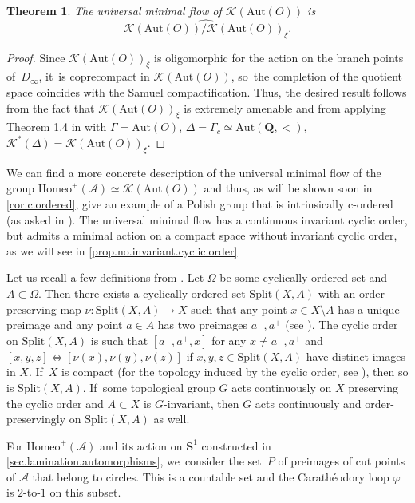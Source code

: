 \documentclass[JEP,XML,SOM,Unicode,NoFloatCountersInSection,published]{cedram}
\theoremstyle{plain}
\newtheorem{theorem}{Theorem}[section]
\theoremstyle{definition}
\theoremstyle{remark}
\newcommand{\Aut}{\mathrm{Aut}}
\newcommand{\Homeo}{\mathrm{Homeo}}
\newcommand{\Split}{\mathrm{Split}}
\newcommand{\A}{\mathcal{A}}
\newcommand{\K}{\mathcal{K}}
\begin{document}
\begin{theorem}
\label{thm.universal.minimal.flow.airplane.completion}
The universal minimal flow of $\K(\Aut(O))$ is
\[
\widehat{\K(\Aut(O))/\K(\Aut(O) )_\xi}.
\]
\end{theorem}

\begin{proof}
Since $\K(\Aut(O) )_\xi$ is oligomorphic for the action on the branch points of~$D_\infty$, it~is coprecompact in $\K(\Aut(O))$, so~the completion of the quotient space coincides with the Samuel compactification.
Thus, the desired result follows from the fact that $\K(\Aut(O) )_\xi$ is extremely amenable and from applying Theorem 1.4 in \cite{Kaleidoscopic2} with $\Gamma=\Aut(O)$, $\Delta=\Gamma_c\simeq \Aut(\mathbf{Q},<)$, $\K^*(\Delta)=\K(\Aut(O) )_\xi$.
\end{proof}

We can find a more concrete description of the universal minimal flow of the group $\Homeo^+(\A)\simeq\K(\Aut(O))$ and thus, as will be shown soon in \cref{cor.c.ordered}, give an example of a Polish group that is intrinsically c-ordered (as asked in \cite[Quest.\,4.9]{Glasner-Megrelishvili-2018}).
The universal minimal flow has a continuous invariant cyclic order, but admits a minimal action on a compact space without invariant cyclic order, as we will see in \cref{prop.no.invariant.cyclic.order}

Let us recall a few definitions from \cite{Glasner-Megrelishvili-2018,Glasner-Megrelishvili-2021}.
Let $\Omega$ be some cyclically ordered set and $A\subset\Omega$.
Then there exists a cyclically ordered set $\Split(X,A)$ with an order-preserving map $\nu\colon\Split(X,A)\to X $ such that any point $x\in X\setminus A$ has a unique preimage and any point $a\in A$ has two preimages $a^-, a^+$ (see \cite[Lem.\,2.11]{Glasner-Megrelishvili-2018}).
The cyclic order on $\Split(X,A)$ is such that $[a^-,a^+,x]$ for any $x\neq a^-,a^+$ and $[x,y,z]\iff [\nu(x),\nu(y),\nu(z)]$ if $x,y,z\in \Split(X,A)$ have distinct images in $X$. If~$X$ is compact (for the topology induced by the cyclic order, see \cite[\S2]{Glasner-Megrelishvili-2018}), then so is $\Split(X,A)$. If~some topological group $G$ acts continuously on $X$ preserving the cyclic order and $A\subset X$ is $G$-invariant, then $G$ acts continuously and order-preservingly on $\Split(X,A)$ as well.

For $\Homeo^+(\A)$ and its action on $\mathbf{S}^1$ constructed in \cref{sec.lamination.automorphisms}, we~consider the set~$P$ of preimages of cut points of $\A$ that belong to circles.
This is a countable set and the Carathéodory loop $\varphi$ is $2$-to-$1$ on this subset.
\end{document}
